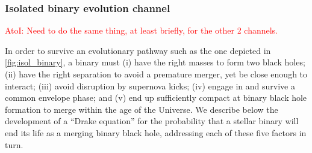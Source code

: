 \documentclass[iop,onecolumn]{revtex4}
\newcommand{\ajf}[1]{\textcolor{red}{AtoI: #1}}
\begin{document}
\subsubsection{Isolated binary evolution channel}
\ajf{Need to do the same thing, at least briefly, for the other 2 channels.}

In order to survive an evolutionary pathway such as the one depicted in \autoref{fig:isol_binary}, a binary must (i) have the right masses to form two black holes; (ii) have the right separation to avoid a premature merger, yet be close enough to interact; (iii) avoid disruption by supernova kicks; (iv) engage in and survive a common envelope phase; and (v) end up sufficiently compact at binary black hole formation to merge within the age of the Universe. We describe below the development of a ``Drake equation'' for the probability that a stellar binary will end its life as a merging binary black hole, addressing each of these five factors in turn.
\end{document}
